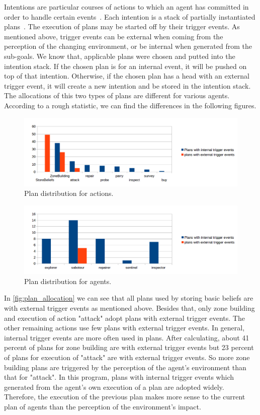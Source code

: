 Intentions are particular courses of actions to which an agent has committed in order to handle certain events~\cite{rafael_BDIAgent_2005}.
Each intention is a stack of partially instantiated plans~\cite{rafael_Javabased_2007}.
The execution of plans may be started off by their trigger events.
As mentioned above, trigger events can be external when coming from the perception of the changing environment, or be internal when generated from the sub-goals.
We know that, applicable plans were chosen and putted into the intention stack.
If the chosen plan is for an internal event, it will be pushed on top of that intention.
Otherwise, if the chosen plan has a head with an external trigger event, it will create a new intention and be stored in the intention stack.
The allocations of this two types of plans are different for various agents.
According to a rough statistic, we can find the differences in the following figures.
\begin{figure}
  \centering
  \includegraphics[width=\textwidth]{images/BDI_plan_distribution_action}
  \caption{Plan distribution for actions.}
  \label{fig:plan_allocation}
\end{figure}
\begin{figure}
  \centering
  \includegraphics[width=\textwidth]{images/BDI_plan_distribution_role}
  \caption{Plan distribution for agents.}
  \label{fig:baselinex}
\end{figure}

In \autoref{fig:plan_allocation} we can see that all plans used by storing basic beliefs are with external trigger events as mentioned above.
Besides that, only zone building and execution of action "attack" adopt plans with external trigger events.
The other remaining actions use few plans with external trigger events.
In general, internal trigger events are more often used in plans.
After calculating, about 41 percent of plans for zone building are with external trigger events but 23 percent of plans for execution of "attack" are with external trigger events.
So more zone building plans are triggered by the perception of the agent's environment than that for "attack".
In this program, plans with internal trigger events which generated from the agent's own execution of a plan are adopted widely.
Therefore, the execution of the previous plan makes more sense to the current plan of agents than the perception of the environment's impact.

